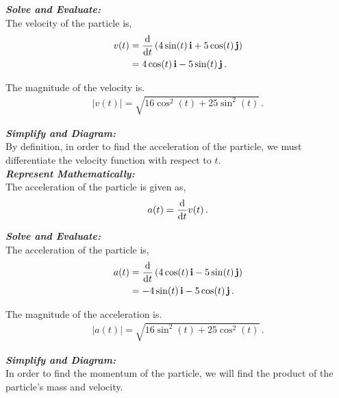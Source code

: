 \begin{subquestions}
\begin{subsubquestions}
\textbf{\textit{Solve and Evaluate:}} \\
The velocity of the particle is,
\begin{align}
	v(t) & = \frac{\mathrm{d}}{\mathrm{d}t} \left(4\sin(t)\,\mathbf{i} + 5\cos(t)\,\mathbf{j} \right) \nonumber \\
	     & = 4\cos(t) \,\mathbf{i} -5\sin(t) \,\mathbf{j}\,.
\end{align}

The magnitude of the velocity is.
\begin{align}
	|v(t)| = \sqrt{16\cos^2(t)+25\sin^2(t)} \,. 
\end{align}
 

\subsubquestion

\textbf{\textit{Simplify and Diagram:}} \\
By definition, in order to find the acceleration of the particle, we must differentiate the velocity function with respect to $t$.\\




\textbf{\textit{Represent Mathematically:}} \\
The acceleration of the particle is given as,
\begin{equation}
	a(t) = \frac{\mathrm{d}}{\mathrm{d}t} v(t) \,.
\end{equation}




\textbf{\textit{Solve and Evaluate:}} \\
The acceleration of the particle is,
\begin{align}
	a(t) & = \frac{\mathrm{d}}{\mathrm{d}t} \left(4\cos(t) \,\mathbf{i} -5\sin(t)\,\mathbf{j} \right) \nonumber \\
	& = -4\sin(t)\,\mathbf{i} - 5\cos(t)\,\mathbf{j} \,.
\end{align}

The magnitude of the acceleration is.
\begin{align}
	|a(t)| = \sqrt{16\sin^2(t)+25\cos^2(t)} \,. 
\end{align}


\subsubquestion

\textbf{\textit{Simplify and Diagram:}} \\
In order to find the momentum of the particle, we will find the product of the particle's mass and velocity.\\





\end{subsubquestions}
\end{subquestions}
